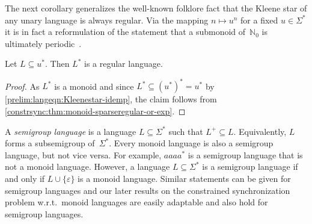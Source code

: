 The next corollary generalizes the well-known folklore fact
that the Kleene star of any unary language is always regular.
Via the mapping $n \mapsto u^n$ for a fixed $u \in \Sigma^*$ 
it is in fact a reformulation of the statement
that a submonoid of~$\mathbb N_0$
is ultimately periodic~\cite[Prop.~2.2]{RosalesGarciaSanchez2009}.

\begin{corollary}
	Let $L \subseteq u^*$. Then $L^*$ is a regular language.
\end{corollary}
\begin{proof}
	As $L^*$ is a monoid and since $L^* \subseteq (u^*)^* = u^*$
	by \cref{prelim:langeqn:Kleenestar-idemp},
	the claim follows from 
	\cref{constrsync:thm:monoid-sparseregular-or-exp}.  
\end{proof} 


\begin{remark}
	A \emph{semigroup language} is a language $L \subseteq \Sigma^*$
	such that $L^+ \subseteq L$. Equivalently, $L$ forms a subsemigroup of~$\Sigma^*$.
	Every monoid language
	is also a semigroup language, but not vice versa. For example, $aaaa^*$
	is a semigroup language that is not a monoid language.
	However, a language $L \subseteq \Sigma^*$ is a semigroup language
	if and only if $L \cup \{\varepsilon\}$ is a monoid language.
	Similar statements can be given for semigroup languages and 
	our later results on the constrained synchronization problem w.r.t.~monoid
	languages are easily adaptable and also hold for semigroup languages.
\end{remark}
